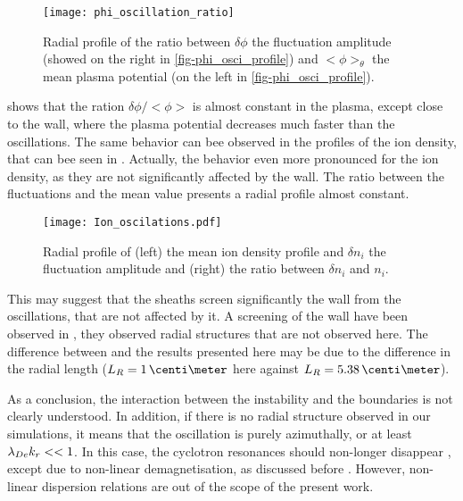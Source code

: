   \begin{figure}[hbt]
    \centering
    \texttt{[image: phi\_oscillation\_ratio]}
    \caption{Radial profile of the ratio between $\delta \phi$ the fluctuation amplitude (showed on the right in \cref{fig-phi_osci_profile}) and $<\phi>_{\theta}$  the mean plasma potential (on the left in \cref{fig-phi_osci_profile}).}
    \label{fig-ratio}
  \end{figure}
  
   shows that the ration $\delta \phi / <\phi>$ is almost constant in the plasma, except close to the wall, where the plasma potential decreases much faster than the oscillations.
  The same behavior can bee observed in the profiles of the ion density, that can bee seen in .
  Actually, the behavior even more pronounced for the ion density, as they are not significantly affected by the wall.
  The ratio between the fluctuations and the mean value presents a radial profile almost constant.
  
  \begin{figure}[hbt]
    \centering
    \texttt{[image: Ion\_oscilations.pdf]}
    \caption{Radial profile of (left) the mean ion density profile and $\delta n_i$ the fluctuation amplitude and (right) the ratio between $\delta n_i$ and $n_i$.}
    \label{fig-ion_oscilation}
  \end{figure}
  
  \vspace{1em}
  This may suggest that the sheaths screen significantly the wall from the oscillations, that are not affected by it.
  A screening of the wall have been observed in \citet{janhunen2018}, they observed radial structures that are not observed here.
  The difference between  \citet{janhunen2018} and the results presented here may be due to the difference in the radial length ($L_R =1 \,\centi\meter$ here against $L_R = 5.38\,\centi\meter$).
  
  As a conclusion, the interaction between the instability and the boundaries is not clearly understood.
  In addition, if there is no radial structure observed in our simulations, it means that the oscillation is purely azimuthally, or at least $\lambda_{De} k_r <<1$.
  In this case, the cyclotron resonances should non-longer disappear \citep{ducrocq2006}, except due to non-linear demagnetisation, as discussed before \citep{boeuf2018,taccogna2019}.
  However, non-linear dispersion relations are out of the scope of the present work.
  
